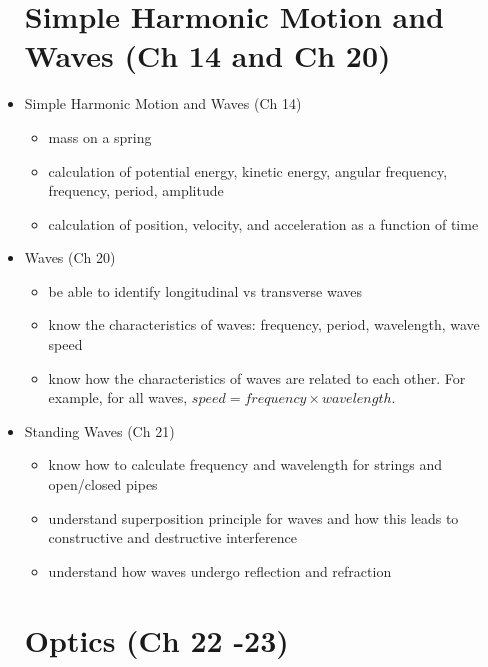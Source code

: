 \begin{itemize}
\section{Simple Harmonic Motion and Waves (Ch 14 and Ch 20)}

\item Simple Harmonic Motion and Waves (Ch 14)
\begin{itemize}
\item mass on a spring
\item calculation of potential energy, kinetic energy, angular frequency, frequency, period, amplitude
\item calculation of position, velocity, and acceleration as a
  function of time
\end{itemize}

\item Waves (Ch 20)
\begin{itemize}
\item be able to identify longitudinal vs transverse waves
\item know the characteristics of waves: frequency, period,
  wavelength, wave speed
\item know how the characteristics of waves are related to each
  other.  For example, for all waves, $speed = frequency \times wavelength$.
\end{itemize}

\item Standing Waves (Ch 21)
\begin{itemize}
\item know how to calculate  frequency and wavelength for strings and open/closed pipes
\item understand superposition principle for waves and how this leads
  to constructive and destructive interference 
\item understand how waves undergo reflection and refraction
\end{itemize}

\section{Optics (Ch 22 -23)}


\end{itemize}
